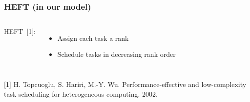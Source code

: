 \documentclass[xcolor=svgnames,titlepage,english,presentation]{beamer}
\begin{document}
\begin{frame}[t]
\begin{columns}
{{\begin{figure}
        \end{figure}
        }
        }
    \end{columns}   

    ~~~~~~~~~~~



\end{frame}


\begin{frame}[t]
    \frametitle{HEFT (in our model)}


  \begin{columns}
  HEFT~[1]:

  \begin{itemize}
      \item Assign each task a rank 
      \item Schedule tasks in decreasing rank order
  \end{itemize}
  
  \begin{tikzpicture}
  \end{tikzpicture}

    \end{columns}   




\footnotesize{[1] H. Topcuoglu, S. Hariri, M.-Y. Wu. Performance-effective and
low-complexity task scheduling for heterogeneous computing. 2002.}
 
\end{frame}
\end{document}
